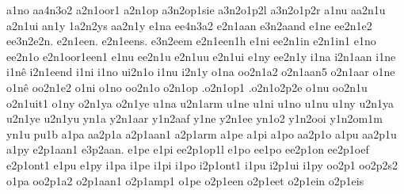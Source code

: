 {%
a1no
aa4n3o2
a2n1oor1
a2n1op
a3n2op1sie
a3n2o1p2l
a3n2o1p2r
a1nu
aa2n1u
a2n1ui
an1y
1a2n2ys
aa2n1y
%
e1na
ee4n3a2
e2n1aan
e3n2aand
e1ne
ee2n1e2
ee3n2e2n.
e2n1een.
e2n1eens.
e3n2eem
e2n1een1h
e1ni
ee2n1in
e2n1in1
e1no
ee2n1o
e2n1oor1een1
e1nu
ee2n1u
e2n1uu
e2n1ui
e1ny
ee2n1y
%
i1na
i2n1aan
i1ne
i1nê
i2n1eend
i1ni
i1no
ui2n1o
i1nu
i2n1y
%
o1na
oo2n1a2
o2n1aan5
o2n1aar
o1ne
o1nê
oo2n1e2
o1ni
o1no
oo2n1o
o2n1op
.o2n1op1
.o2n1o2p2e
o1nu
oo2n1u
o2n1uit1
o1ny
o2n1ya
o2n1ye
%
u1na
u2n1arm
u1ne
u1ni
u1no
u1nu
u1ny
u2n1ya
u2n1ye
u2n1yu
%
yn1a
y2n1aar
y1n2aaf
y1ne
y2n1ee
yn1o2
y1n2ooi
y1n2om1m
yn1u
%
%
pu1b
%
%
a1pa
aa2p1a
a2p1aan1
a2p1arm
a1pe
a1pi
a1po
aa2p1o
a1pu
aa2p1u
a1py
%
e2p1aan1
e3p2aan.
e1pe
e1pi
ee2p1op1l
e1po
ee1po
ee2p1on
ee2p1oef
e2p1ont1
e1pu
e1py
%
i1pa
i1pe
i1pi
i1po
i2p1ont1
i1pu
i2p1ui
i1py
%
oo2p1
oo2p2s2
o1pa
oo2p1a2
o2p1aan1
o2p1amp1
o1pe
o2p1een
o2p1eet
o2p1ein
o2p1eis
}
